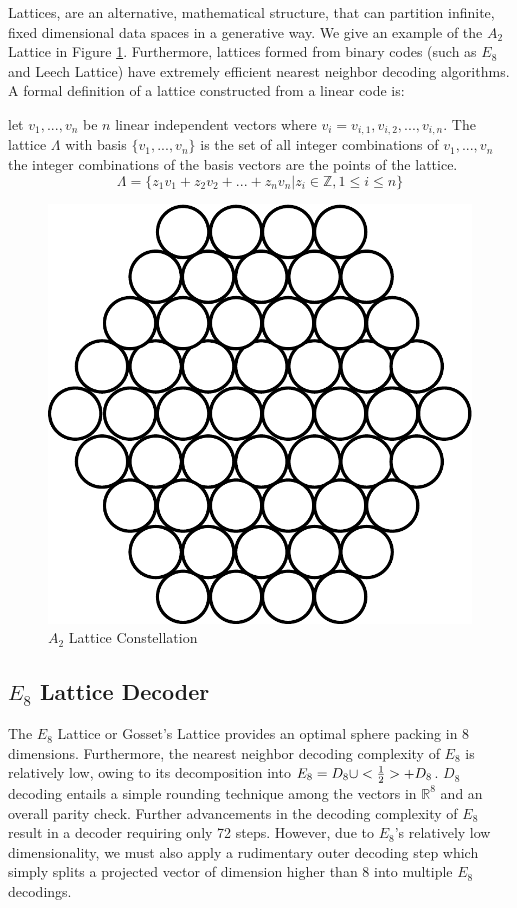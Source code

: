 Lattices, are an alternative, mathematical structure, that can partition infinite, fixed dimensional data spaces in a
generative way. We give an example of the $A_2$ Lattice in Figure \ref{lshex}.  Furthermore, lattices formed from binary codes (such as $E_8$ and Leech Lattice) have extremely
efficient nearest neighbor decoding algorithms.  A formal definition of a lattice constructed from a linear code is:
\begin{Definition}\label{latticedef}
let $v_1, ...  , v_n$ be $n$ linear independent vectors where $v_i=v_{i,1}, v_{i,2}, ...
,v_{i,n}$.  The lattice $\Lambda$ with basis $\{v_1, ...  , v_n\}$ is the set of all
integer combinations of $v_1, ...  , v_n$ the integer combinations of the basis vectors
are the points of the lattice.
$$\Lambda = \{z_1v_1+z_2v_2+ ...  +z_nv_n | z_i\in \mathbb{Z}, 1 \leq i \leq n\}$$ 
\end{Definition}

\begin{figure}
    \centerline{\includegraphics[width=.4\textwidth]{figs/2dLat}}
    \caption{$A_2$ Lattice Constellation}\label{lshex}
\end{figure}

\subsection{$E_8$ Lattice Decoder}

The $E_8$ Lattice or Gosset's Lattice provides an optimal sphere packing in 8 dimensions.  Furthermore, the nearest
neighbor decoding complexity of $E_8$ is relatively low, owing to its decomposition into $E_8 = D_8 \cup
<{1\over2}>+D_8$.  $D_8$ decoding entails a simple rounding technique among the vectors in $\mathbb{R}^8$ and an overall
parity check.  Further advancements \cite{SPLAG} in the decoding complexity of $E_8$ result in a decoder requiring only
72 steps.  However, due to $E_8$'s relatively low dimensionality, we must also apply a rudimentary outer decoding step
which simply splits a projected vector of dimension higher than 8 into multiple $E_8$ decodings.

